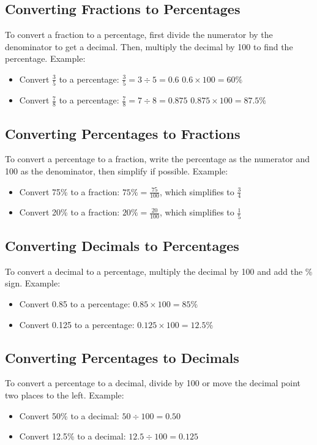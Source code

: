 \subsection{Converting Fractions to Percentages}
To convert a fraction to a percentage, first divide the numerator by the denominator to get a decimal. Then, multiply the decimal by 100 to find the percentage. Example:
\begin{itemize}
    \item Convert $\frac{3}{5}$ to a percentage: $\frac{3}{5} = 3 \div 5 = 0.6$ $0.6 \times 100 = 60\%$
    \item Convert $\frac{7}{8}$ to a percentage: $\frac{7}{8} = 7 \div 8 = 0.875$ $0.875 \times 100 = 87.5\%$
\end{itemize}

\subsection{Converting Percentages to Fractions}
To convert a percentage to a fraction, write the percentage as the numerator and 100 as the denominator, then simplify if possible. Example:
\begin{itemize}
    \item Convert 75\% to a fraction: $75\% = \frac{75}{100}$, which simplifies to $\frac{3}{4}$
    \item Convert 20\% to a fraction: $20\% = \frac{20}{100}$, which simplifies to $\frac{1}{5}$
\end{itemize}

\subsection{Converting Decimals to Percentages}
To convert a decimal to a percentage, multiply the decimal by 100 and add the \% sign. Example:
\begin{itemize}
    \item Convert 0.85 to a percentage: $0.85 \times 100 = 85\%$
    \item Convert 0.125 to a percentage: $0.125 \times 100 = 12.5\%$
\end{itemize}

\subsection{Converting Percentages to Decimals}
To convert a percentage to a decimal, divide by 100 or move the decimal point two places to the left. Example:
\begin{itemize}
    \item Convert 50\% to a decimal: $50 \div 100 = 0.50$
    \item Convert 12.5\% to a decimal: $12.5 \div 100 = 0.125$
\end{itemize}

